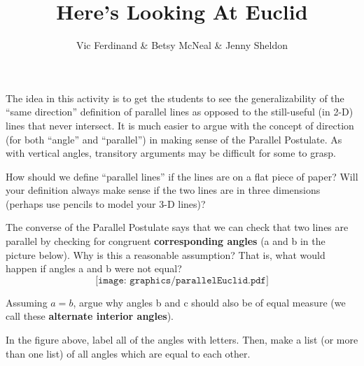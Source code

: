 \documentclass{ximera}
\title{Here's Looking At Euclid}
\author{Vic Ferdinand \& Betsy McNeal \& Jenny Sheldon}
\begin{document}
\begin{abstract}
\end{abstract}

\maketitle


\begin{instructorIntro}
The idea in this activity is to get the students to see the generalizability of the ``same direction'' definition of parallel lines as opposed to the still-useful (in 2-D) lines that never intersect.  It is much easier to argue with the concept of direction (for both ``angle'' and ``parallel'') in making sense of the Parallel Postulate.  As with vertical angles, transitory arguments may be difficult for some to grasp.
\end{instructorIntro}


\begin{question}
How should we define ``parallel lines'' if the lines are on a flat piece of paper?  Will your definition always make sense if the two lines are in three dimensions (perhaps use pencils to model your 3-D lines)?
\end{question}









\begin{problem} \label{Euclid1}
The converse of the Parallel Postulate says that we can check that two lines are parallel by checking for congruent {\bf corresponding angles} (a and b in the picture below).  Why is this a reasonable assumption? That is, what would happen if angles a and b were not equal?  
\[
\texttt{[image: graphics/parallelEuclid.pdf]}
\]
\end{problem}







\begin{problem}
Assuming $a = b$, argue why angles b and c should also be of equal measure (we call these {\bf alternate interior angles}).
\end{problem}

\begin{problem}
In the figure above, label all of the angles with letters.  Then, make a list (or more than one list) of all angles which are equal to each other.
\end{problem}
\end{document}
